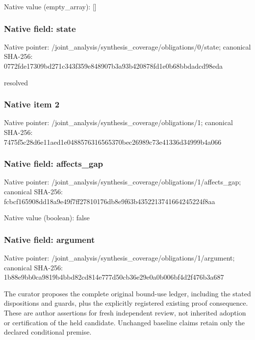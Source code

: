 \documentclass[10pt,a4paper]{article}
\begin{document}
Native value (empty\_\allowbreak{}array): []

\subsubsection{Native field: state}
Native pointer: /joint\_\allowbreak{}analysis/synthesis\_\allowbreak{}coverage/obligations/0/state; canonical SHA-256: 0772fde17309bd271c343f359e848907b3a93b420878fd1e0b68bbdadcd98eda

\begingroup\raggedright\sloppy resolved\par\endgroup

\subsubsection{Native item 2}
Native pointer: /joint\_\allowbreak{}analysis/synthesis\_\allowbreak{}coverage/obligations/1; canonical SHA-256: 7475f5c28d6e11aed1e0488576316565370bec26989c73e41336d34999b4a066

\subsubsection{Native field: affects\_\allowbreak{}gap}
Native pointer: /joint\_\allowbreak{}analysis/synthesis\_\allowbreak{}coverage/obligations/1/affects\_\allowbreak{}gap; canonical SHA-256: fcbcf165908dd18a9e49f7ff27810176db8e9f63b4352213741664245224f8aa

Native value (boolean): false

\subsubsection{Native field: argument}
Native pointer: /joint\_\allowbreak{}analysis/synthesis\_\allowbreak{}coverage/obligations/1/argument; canonical SHA-256: 1b88e9bb0ca9819b4bbd82cd814e777d50cb36e29e0a0b006bf4d2f476b3a687

\begingroup\raggedright\sloppy The curator proposes the complete original bound-use ledger,\allowbreak{} including the stated dispositions and guards,\allowbreak{} plus the explicitly registered existing proof consequence. These are author assertions for fresh independent review,\allowbreak{} not inherited adoption or certification of the held candidate. Unchanged baseline claims retain only the declared conditional premise.\par\endgroup
\end{document}
